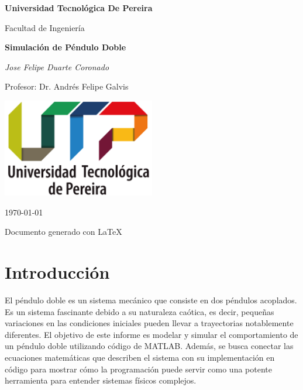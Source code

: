 \documentclass[12pt]{article}
\begin{document}
\begin{titlepage}
    \centering
    \vspace*{2cm}
    
    {\Large\bfseries Universidad Tecnológica De Pereira\par}
    \vspace{1.5cm}
    
    {\large Facultad de Ingeniería\par}
    \vspace{2cm}
    
    {\huge\bfseries Simulación de Péndulo Doble\par}
    \vspace{2cm}
    
    {\Large\itshape Jose Felipe Duarte Coronado\par}
    \vspace{1cm}
    
    {\Large Profesor: Dr. Andrés Felipe Galvis\par}
    \vspace{2cm}
    
    \includegraphics[width=0.5\textwidth]{Logo_U.T.P.png}
     \vspace{2cm}
    
    {\large\today\par}
    \vfill
    
    {\footnotesize Documento generado con \LaTeX\par}
\end{titlepage}


\tableofcontents
\newpage

\section{Introducción}
El péndulo doble es un sistema mecánico que consiste en dos péndulos acoplados. Es un sistema fascinante debido a su naturaleza caótica, es decir, pequeñas variaciones en las condiciones iniciales pueden llevar a trayectorias notablemente diferentes. El objetivo de este informe es modelar y simular el comportamiento de un péndulo doble utilizando código de MATLAB. Además, se busca conectar las ecuaciones matemáticas que describen el sistema con su implementación en código para mostrar cómo la programación puede servir como una potente herramienta para entender sistemas físicos complejos.
\end{document}
